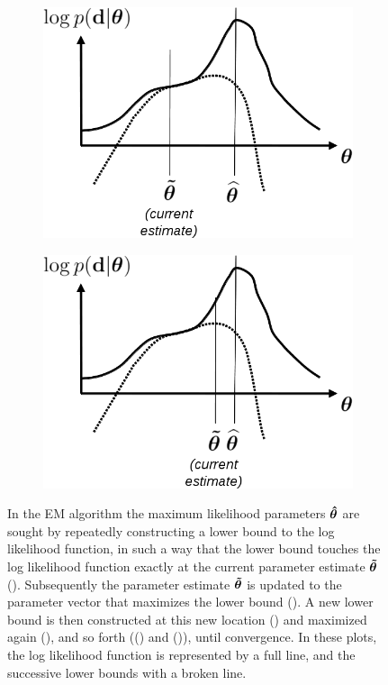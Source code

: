 \documentclass[10pt,twoside]{book}
\begin{document}
\begin{figure}
\begin{subfigure}{0.48\textwidth}
    \includegraphics[width=\textwidth]{lowerBound5}
    \caption{}
    \label{fig:lowerboundOptimization_5}
  \end{subfigure}
  \hfill
  \begin{subfigure}{0.48\textwidth}
    \centering
    \includegraphics[width=\textwidth]{lowerBound6}
    \caption{}
    \label{fig:lowerboundOptimization_6}
  \end{subfigure}
  \caption{In the EM algorithm the maximum likelihood parameters ${\mbox{\boldmath {${\hat{\theta}}$}}}$ are sought by repeatedly constructing a lower bound to the log likelihood function, in such a way that the lower bound touches the log likelihood function exactly at the current parameter estimate ${\mbox{\boldmath {${\tilde{\theta}}$}}}$ (). Subsequently the parameter estimate ${\mbox{\boldmath {${\tilde{\theta}}$}}}$ is updated to the parameter vector that maximizes the lower bound (). A new lower bound is then constructed at this new location () and maximized again (), and so forth (() and ()), until convergence. In these plots, the log likelihood function is represented by a full line, and the successive lower bounds with a broken line.}
  \label{fig:lowerboundOptimization}
\end{figure}
\end{document}
